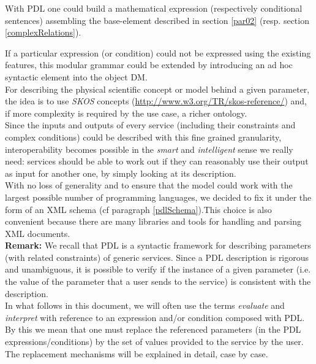 \documentclass[a4paper,11pt] {ivoa}
\begin{document}
With PDL one could build a mathematical expression (respectively conditional sentences) assembling the base-element described in section \ref{par02} (resp. section \ref{complexRelations}). 

If a particular expression (or condition) could not be expressed using the existing features,
this modular grammar could be extended by introducing an ad hoc syntactic element into the object DM. \\

For describing the physical scientific concept or model behind a given parameter, the idea is to use
{\it SKOS} concepts
(\href{http://www.w3.org/TR/skos-reference/}{http://www.w3.org/TR/skos-reference/}) and, if more complexity is required by the use case, a richer ontology.\\

Since the inputs and outputs  of every service (including their constraints and complex conditions)
could be described with this fine grained granularity, interoperability becomes possible in the {\it
smart} and {\it intelligent} sense we really need: services should be able to work out if they can
reasonably use their output as input for another one, by simply looking at its description.\\

With no loss of generality and to ensure that the model could work with the largest possible number
of programming languages, we decided to fix it under the form of an XML schema (cf paragraph \ref{pdlSchema}).This choice is also
convenient because there are many libraries and tools for handling and parsing XML documents.\\

{\bf Remark:} We recall that PDL is a syntactic framework for describing parameters (with related
constraints) of generic services. Since a PDL description is rigorous and unambiguous, 
it is possible to verify if the instance of a given parameter (i.e. the value of the parameter
that a user sends to the service) is consistent with the description.\\
In what follows in this document, we will often use the terms {\it evaluate} and {\it interpret}
with reference to an expression and/or condition composed with PDL. By this we mean that one must
replace the referenced parameters (in the PDL expressions/conditions) by the set of values provided to the
service by the user. The replacement mechanisms will be explained in detail, case by case.
\end{document}
